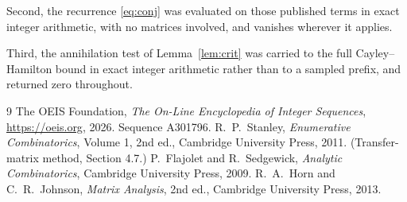 \documentclass[11pt,a4paper]{article}
\theoremstyle{plain}
\theoremstyle{definition}
\begin{document}
Second, the recurrence \eqref{eq:conj} was evaluated on those published terms in exact
integer arithmetic, with no matrices involved, and vanishes wherever it applies.

Third, the annihilation test of Lemma~\ref{lem:crit} was carried to the full
Cayley--Hamilton bound in exact integer arithmetic rather than to a sampled prefix, and
returned zero throughout.

\begin{thebibliography}{9}
 The OEIS Foundation, \emph{The On-Line Encyclopedia of Integer
Sequences}, \url{https://oeis.org}, 2026. Sequence A301796.
 R.~P.~Stanley, \emph{Enumerative Combinatorics}, Volume 1, 2nd ed.,
Cambridge University Press, 2011. (Transfer-matrix method, Section 4.7.)
 P.~Flajolet and R.~Sedgewick, \emph{Analytic Combinatorics}, Cambridge
University Press, 2009.
 R.~A.~Horn and C.~R.~Johnson, \emph{Matrix Analysis}, 2nd ed., Cambridge
University Press, 2013.
\end{thebibliography}
\end{document}
